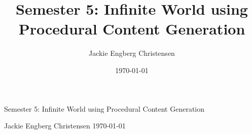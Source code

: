 \documentclass[a4paper,12pt]{report}
\title{Semester 5: Infinite World using Procedural Content Generation}
\author{Jackie Engberg Christensen}
\date{\today}
\begin{document}
\begin{titlepage}
\centering
{\LARGE Semester 5: Infinite World using Procedural Content Generation}
\begin{figure}[H]
\centering
\end{figure}
{\large Jackie Engberg Christensen\linebreak
\today}
\end{titlepage}

\newpage\null\thispagestyle{empty}\newpage


%
\tableofcontents














\newpage



\end{document}
